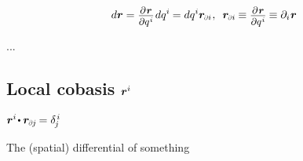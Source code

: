 \nopagebreak\vspace{-0.2em}\begin{equation}\label{differentialoflocationvector}
d\locationvector
=
\scalebox{.9}{$ \displaystyle\frac{\raisebox{-0.2em}{$ \partial \hspace{.15ex} \locationvector $}}{\partial q^{\hspace{.1ex}i}} $} \hspace{.2ex} dq^i \hspace{-0.1ex}
=
dq^i \locationvector_\differentialindex{i}
\hspace{.1ex} , \hspace{.5em}
\locationvector_\differentialindex{i} \hspace{-0.1ex} \equiv \scalebox{0.9}{$ \displaystyle\frac{\raisebox{-0.2em}{$ \partial \hspace{.15ex} \locationvector $}}{\partial q^{\hspace{.1ex}i}} $} \hspace{-0.1ex}
\equiv \partial_i \hspace{.1ex} \locationvector
\end{equation}

...

\subsection*{%
Local cobasis
${\bm{r}^i}$%
}

${\locationvector^i \hspace{-0.3ex} \dotp \locationvector_\differentialindex{\hspace{-0.1ex}j} \hspace{-0.2ex} = \delta_{\hspace{-0.15ex}j}^{\hspace{.2ex}i}}$

The (spatial) differential of something

